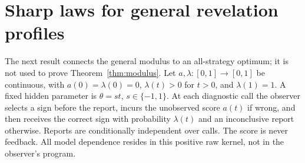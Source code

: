 \section{Sharp laws for general revelation profiles}\label{sec:profiles}
The next result connects the general modulus to an all-strategy optimum; it is not used to prove Theorem~\ref{thm:modulus}. Let $a,\lambda:[0,1]\to[0,1]$ be continuous, with $a(0)=\lambda(0)=0$, $\lambda(t)>0$ for $t>0$, and $\lambda(1)=1$. A fixed hidden parameter is $\theta=st$, $s\in\{-1,1\}$. At each diagnostic call the observer selects a sign before the report, incurs the unobserved score $a(t)$ if wrong, and then receives the correct sign with probability $\lambda(t)$ and an inconclusive report otherwise. Reports are conditionally independent over calls. The score is never feedback. All model dependence resides in this positive raw kernel, not in the observer's program.

